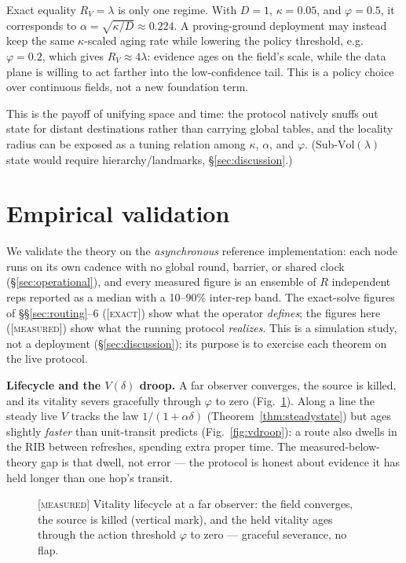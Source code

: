 \documentclass[11pt]{article}
\theoremstyle{plain}
\numberwithin{equation}{section}
\begin{document}
Exact equality $R_V=\lambda$ is only one regime. With $D=1$, $\kappa=0.05$, and $\varphi=0.5$, it corresponds to $\alpha=\sqrt{\kappa/D}\approx0.224$. A proving-ground deployment may instead keep the same $\kappa$-scaled aging rate while lowering the policy threshold, e.g. $\varphi=0.2$, which gives $R_V\approx4\lambda$: evidence ages on the field's scale, while the data plane is willing to act farther into the low-confidence tail. This is a policy choice over continuous fields, not a new foundation term.

This is the payoff of unifying space and time: the protocol natively snuffs out state for distant destinations rather than carrying global tables, and the locality radius can be exposed as a tuning relation among $\kappa$, $\alpha$, and $\varphi$. (Sub-$\mathrm{Vol}(\lambda)$ state would require hierarchy/landmarks, §\ref{sec:discussion}.)

\section{Empirical validation}\label{sec:empirical}

We validate the theory on the \emph{asynchronous} reference implementation: each node runs on its own cadence with no global round, barrier, or shared clock (§\ref{sec:operational}), and every measured figure is an ensemble of $R$ independent reps reported as a median with a 10--90\% inter-rep band. The exact-solve figures of §§\ref{sec:routing}--6 (\textsc{[exact]}) show what the operator \emph{defines}; the figures here (\textsc{[measured]}) show what the running protocol \emph{realizes}. This is a simulation study, not a deployment (§\ref{sec:discussion}); its purpose is to exercise each theorem on the live protocol.

\textbf{Lifecycle and the $V(\delta)$ droop.} A far observer converges, the source is killed, and its vitality severs gracefully through $\varphi$ to zero (Fig.~\ref{fig:timeseries}). Along a line the steady live $V$ tracks the law $1/(1+\alpha\delta)$ (Theorem~\ref{thm:steadystate}) but ages slightly \emph{faster} than unit-transit predicts (Fig.~\ref{fig:vdroop}): a route also dwells in the RIB between refreshes, spending extra proper time. The measured-below-theory gap is that dwell, not error — the protocol is honest about evidence it has held longer than one hop's transit.

\begin{figure}[tbp]
\centering

\caption{\textsc{[measured]} Vitality lifecycle at a far observer: the field converges, the source is killed (vertical mark), and the held vitality ages through the action threshold $\varphi$ to zero — graceful severance, no flap.}
\label{fig:timeseries}
\end{figure}
\end{document}
